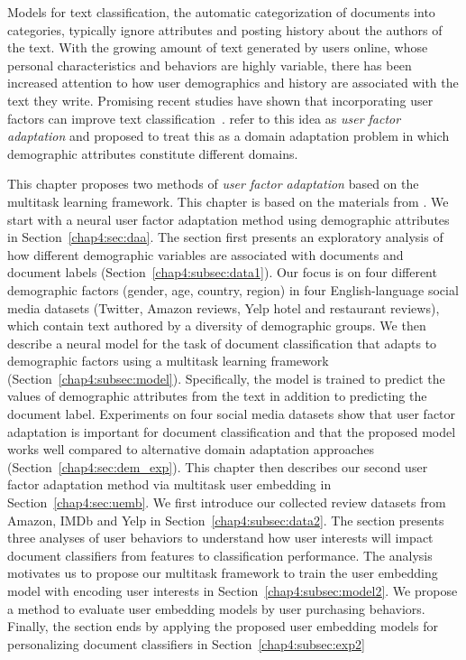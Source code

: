 Models for text classification, the automatic categorization of documents into categories, typically ignore attributes and posting history about the authors of the text.
With the growing amount of text generated by users online, whose personal characteristics and behaviors are highly variable,
there has been increased attention to how user demographics and history are associated with the text they write.
Promising recent studies have shown that incorporating user factors can improve text classification~\cite{volkova2013exploring, hovy2015demographic, amir2016modelling, yang2017overcoming, li2018towards, pan2019social}. 
\cite{lynn2017human} refer to this idea as {\em user factor adaptation}
and proposed to treat this as a domain adaptation problem in which demographic attributes constitute different domains.

This chapter proposes two methods of \textit{user factor adaptation} based on the multitask learning framework. 
This chapter is based on the materials from \cite{huang2019neuraluser, huang2020user}.
We start with a neural user factor adaptation method using demographic attributes in Section~\ref{chap4:sec:daa}.
The section first presents an exploratory analysis of how different demographic variables are associated with documents and document labels (Section~\ref{chap4:subsec:data1}).
Our focus is on four different demographic factors (gender, age, country, region) in four English-language social media datasets (Twitter, Amazon reviews, Yelp hotel and restaurant reviews), which contain text authored by a diversity of demographic groups.
We then describe a neural model for the task of document classification that adapts to demographic factors using a multitask learning framework (Section~\ref{chap4:subsec:model}). Specifically, the model is trained to predict the values of demographic attributes from the text in addition to predicting the document label. 
Experiments on four social media datasets show that user factor adaptation is important for document classification and that the proposed model works well compared to alternative domain adaptation approaches (Section~\ref{chap4:sec:dem_exp}).
This chapter then describes our second user factor adaptation method via multitask user embedding in Section~\ref{chap4:sec:uemb}.
We first introduce our collected review datasets from Amazon, IMDb and Yelp in Section~\ref{chap4:subsec:data2}.
The section presents three analyses of user behaviors to understand how user interests will impact document classifiers from features to classification performance.
The analysis motivates us to propose our multitask framework to train the user embedding model with encoding user interests in Section~\ref{chap4:subsec:model2}. 
We propose a method to evaluate user embedding models by user purchasing behaviors. 
Finally, the section ends by applying the proposed user embedding models for personalizing document classifiers in Section~\ref{chap4:subsec:exp2}

